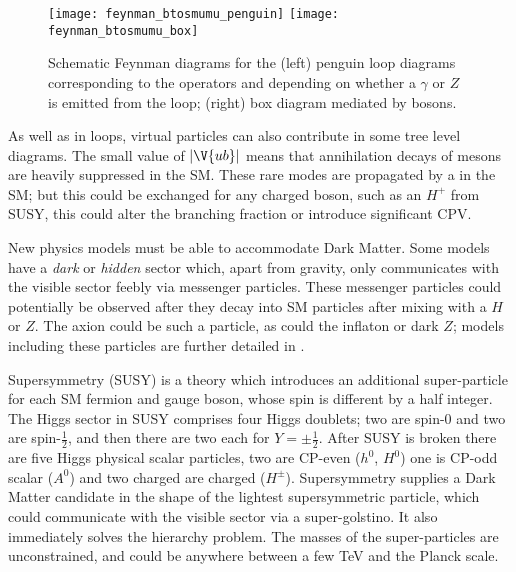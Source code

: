\begin{figure}
  \begin{center}
    \texttt{[image: feynman\_btosmumu\_penguin]}
    \texttt{[image: feynman\_btosmumu\_box]}
    \caption[Schematic Feynman diagrams for loop and box diagrams]
    {\small
      Schematic Feynman diagrams for the
      (left) penguin loop diagrams corresponding to the operators  and  depending on
      whether a $\gamma$ or $Z$ is emitted from the loop;
      (right)  box diagram mediated by \Wp bosons.
    }
    \label{fig:hhh:loops}
  \end{center}
\end{figure}

As well as in loops, virtual particles can also contribute in some tree level diagrams.
The small value of $|\V{ub}|$ means that annihilation decays of \Bp mesons are heavily
suppressed in the SM.
These rare modes are propagated by a \Wp in the SM; but this could be exchanged for any charged
boson, such as an $H^+$ from SUSY, this could alter the branching fraction or
introduce significant CPV.

New physics models must be able to accommodate Dark Matter.
Some models have a \emph{dark} or \emph{hidden} sector which, apart from gravity, only
communicates with the visible sector feebly via messenger particles.
These messenger particles could potentially be observed after they decay into SM particles after
mixing with a $H$ or $Z$.
The axion could be such a particle, as could the inflaton or dark $Z$; models including these
particles are further detailed in .

Supersymmetry (SUSY) is a theory which introduces an additional super-particle for each SM fermion and
gauge boson, whose spin is different by a half integer.
The Higgs sector in SUSY comprises four Higgs doublets; two are spin-0 and two are spin-$\tfrac12$,
and then there are two each for $Y=\pm\tfrac12$.
After SUSY is broken there are five Higgs physical scalar particles, two are CP-even ($h^0$,
$H^0$) one is CP-odd scalar ($A^0$) and two charged are charged ($H^\pm$).
Supersymmetry supplies a Dark Matter candidate in the shape of the lightest supersymmetric
particle, which could communicate with the visible sector via a super-golstino.
It also immediately solves the hierarchy problem.
The masses of the super-particles are unconstrained, and could be anywhere between a few TeV and
the Planck scale.


